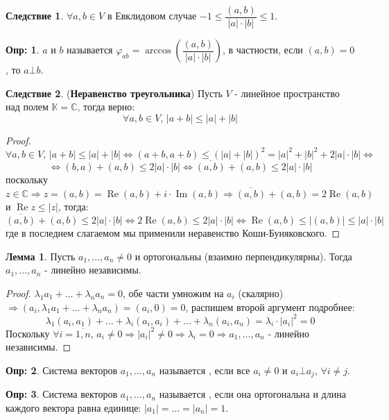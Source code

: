 \documentclass[12pt]{article}
\newcommand{\MC}{\mathbb{C}}
\newcommand{\MK}{\mathbb{K}}
\newcommand{\RE}{\operatorname{Re}}
\newcommand{\IM}{\operatorname{Im}}
\theoremstyle{definition}
\newtheorem{defn}{Опр:}
\newtheorem{lemma}{Лемма}
\newtheorem{corollary}{Следствие}
\begin{document}
\begin{corollary}
	$\forall a,b \in V$ в Евклидовом случае $-1 \leq \dfrac{(a,b)}{|a|{\cdot}|b|} \leq 1$.
\end{corollary}
\begin{defn}
	 $a$ и $b$ называется $\varphi_{ab} = \arccos\left(\dfrac{(a,b)}{|a|{\cdot}|b|}\right)$, в частности, если $(a,b) = 0$, то $a\bot b$.
\end{defn}
\begin{corollary}(\textbf{Неравенство треугольника})
	Пусть $V$ - линейное пространство над полем $\MK = \MC$, тогда верно:
	$$
		\forall a,b \in V, \, |a + b| \leq |a| + |b|
	$$
\end{corollary}
\begin{proof}
	$$
		\forall a,b \in V, \, |a + b| \leq |a| + |b| \Leftrightarrow (a + b, a+ b) \leq (|a| + |b|)^2 = |a|^2 + |b|^2 + 2|a|{\cdot}|b| \Leftrightarrow
	$$
	$$
		\Leftrightarrow (b,a) + (a,b) \leq 2|a|{\cdot}|b| \Leftrightarrow \overline{(a,b)} + (a,b) \leq 2|a|{\cdot}|b| 
	$$
	поскольку $z \in \MC \Rightarrow z = (a,b) = \RE{(a,b)} + i{\cdot}\IM{(a,b)} \Rightarrow \overline{(a,b)} + (a,b) = 2 \RE{(a,b)}$
	и $\RE{z} \leq |z|$, тогда:
	$$
		\overline{(a,b)} + (a,b) \leq 2|a|{\cdot}|b| \Leftrightarrow 2 \RE{(a,b)} \leq 2|a|{\cdot}|b| \Leftrightarrow \RE{(a,b)} \leq |(a,b)| \leq |a|{\cdot}|b|
	$$
	где в последнем слагаемом мы применили неравенство Коши-Буняковского.
\end{proof}
\begin{lemma}
	Пусть $a_1, \dotsc, a_n \neq 0$ и ортогональны (взаимно перпендикулярны). Тогда $a_1,\dotsc, a_n$ - линейно независимы.
\end{lemma}
\begin{proof}
	$\lambda_1 a_1 + \dotsc + \lambda_n a_n = 0$, обе части умножим на $a_i$ (скалярно) $\Rightarrow (a_i,\lambda_1 a_1 + \dotsc + \lambda_n a_n ) = (a_i, 0) = 0$, распишем второй аргумент подробнее:
	$$
		\lambda_1(a_i,a_1) + \dotsc + \lambda_i (a_i, a_i) + \dotsc + \lambda_n(a_i, a_n) = \lambda_i{\cdot}|a_i|^2 = 0 
	$$
	Поскольку $\forall i = \overline{1,n}, \, a_i \neq 0 \Rightarrow |a_i|^2 \neq 0 \Rightarrow \lambda_i = 0 \Rightarrow a_1,\dotsc, a_n$ - линейно независимы.
\end{proof}
\begin{defn}
	Система векторов $a_1,\dotsc, a_n$ называется , если все $a_i \neq 0$ и $a_i \bot a_j, \, \forall i \neq j$. 
\end{defn}
\begin{defn}
	Система векторов $a_1,\dotsc, a_n$ называется , если она ортогональна и длина каждого вектора равна единице: $|a_1| = \dotsc = |a_n| = 1$.
\end{defn}
\end{document}
